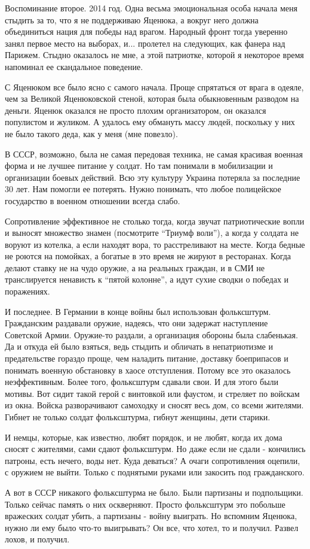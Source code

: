 
Воспоминание второе. 2014 год. Одна весьма эмоциональная особа начала меня
стыдить за то, что я не поддерживаю Яценюка, а вокруг него должна объединиться
нация для победы над врагом. Народный фронт тогда уверенно занял первое место
на выборах, и... пролетел на следующих, как фанера над Парижем. Стыдно
оказалось не мне, а этой патриотке, которой я некоторое время напоминал ее
скандальное поведение. 

С Яценюком все было ясно с самого начала. Проще спрятаться от врага в одеяле,
чем за Великой Яценюковской стеной, которая была обыкновенным разводом на
деньги. Яценюк оказался не просто плохим организатором, он оказался популистом
и жуликом. А удалось ему обмануть массу людей, поскольку у них не было такого
деда, как у меня (мне повезло). 

В СССР, возможно, была не самая передовая техника, не самая красивая военная
форма и не лучшее питание у солдат. Но там понимали в мобилизации и организации
боевых действий. Всю эту культуру Украина потеряла за последние 30 лет. Нам
помогли ее потерять. Нужно понимать, что любое полицейское государство в
военном отношении всегда слабо. 

Сопротивление эффективное не столько тогда, когда звучат патриотические вопли и
выносят множество знамен (посмотрите \enquote{Триумф воли}), а когда у солдата не
воруют из котелка, а если находят вора, то расстреливают на месте. Когда бедные
не роются на помойках, а богатые в это время не жируют в ресторанах. Когда
делают ставку не на чудо оружие, а на реальных граждан, и в СМИ не
транслируется ненависть к \enquote{пятой колонне}, а идут сухие сводки о победах и
поражениях. 

И последнее. В Германии в конце войны был использован фольксштурм. Гражданским
раздавали оружие, надеясь, что они задержат наступление Советской Армии.
Оружие-то раздали, а организация обороны была слабенькая. Да и откуда ей было
взяться, ведь стыдить и обличать в непатриотизме и предательстве гораздо проще,
чем наладить питание, доставку боеприпасов и понимать военную обстановку в
хаосе отступления. Потому все это оказалось неэффективным. Более того,
фольксштурм сдавали свои. И для этого были мотивы. Вот сидит такой герой с
винтовкой или фаустом, и стреляет по войскам из окна. Войска разворачивают
самоходку и сносят весь дом, со всеми жителями. Гибнет не только солдат
фольксштурма, гибнут женщины, дети старики. 

И немцы, которые, как известно, любят порядок, и не любят, когда их дома сносят
с жителями, сами сдают фольксштурм. Но даже если не сдали - кончились патроны,
есть нечего, воды нет. Куда деваться? А очаги сопротивления оцепили, с оружием
не выйти. Только с поднятыми руками или закосить под гражданского.

А вот в СССР никакого фольксштурма не было. Были партизаны и подпольщики.
Только сейчас память о них оскверняют. Просто фольксштурм это побольше
вражеских солдат убить, а партизаны - войну выиграть. Но вспомним Яценюка,
нужно ли ему было что-то выигрывать? Он все, что хотел, то и получил. Развел
лохов, и получил.
